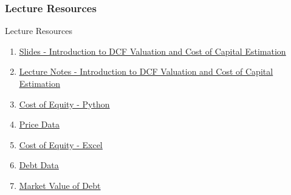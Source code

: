 \documentclass[handout, 11pt]{beamer}
\begin{document}
\begin{frame}
\frametitle{Lecture Resources}
{
\begin{block}{Lecture Resources}
\begin{enumerate}
\item \textcolor{blue}{\underline{\href{https://nickderobertis.github.io/fin-model-course/\_static/generated/pdfs/S11 Introduction to DCF Valuation and Cost of Capital Estimation.pdf}{Slides - Introduction to DCF Valuation and Cost of Capital Estimation}}}
\item \textcolor{blue}{\underline{\href{https://nickderobertis.github.io/fin-model-course/\_static/generated/pdfs/LN11 Introduction to DCF Valuation and Cost of Capital Estimation.pdf}{Lecture Notes - Introduction to DCF Valuation and Cost of Capital Estimation}}}
\item \textcolor{blue}{\underline{\href{https://nickderobertis.github.io/fin-model-course/\_static/Examples/DCF/Cost of Equity/Determining the Cost of Equity.ipynb}{Cost of Equity - Python}}}
\item \textcolor{blue}{\underline{\href{https://nickderobertis.github.io/fin-model-course/\_static/Examples/DCF/Cost of Equity/price data.xlsx}{Price Data}}}
\item \textcolor{blue}{\underline{\href{https://nickderobertis.github.io/fin-model-course/\_static/Examples/DCF/Cost of Equity/DCF Cost of Equity.xlsx}{Cost of Equity - Excel}}}
\item \textcolor{blue}{\underline{\href{https://nickderobertis.github.io/fin-model-course/\_static/Examples/DCF/Cost of Debt/debt data.xlsx}{Debt Data}}}
\item \textcolor{blue}{\underline{\href{https://nickderobertis.github.io/fin-model-course/\_static/Examples/DCF/Cost of Debt/Market Value of Debt.ipynb}{Market Value of Debt}}}
\end{enumerate}
\vfill
\end{block}
}
\label{frames:resources}
\end{frame}
\small
\end{document}
